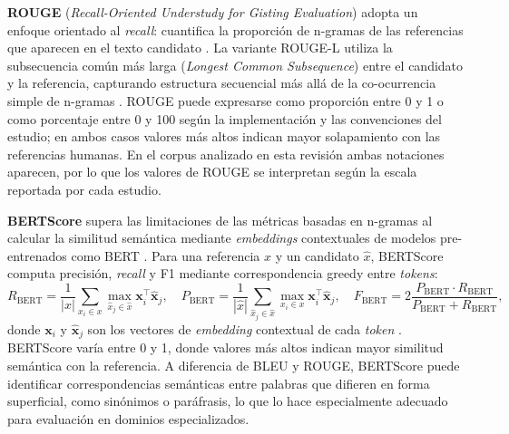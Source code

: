 \textbf{ROUGE} (\textit{Recall-Oriented Understudy for Gisting Evaluation}) adopta un enfoque orientado al \textit{recall}: cuantifica la proporción de n-gramas de las referencias que aparecen en el texto candidato \parencite[p.~1]{lin-2004-rouge}. La variante ROUGE-L utiliza la subsecuencia común más larga (\textit{Longest Common Subsequence}) entre el candidato y la referencia, capturando estructura secuencial más allá de la co-ocurrencia simple de n-gramas \parencite[p.~2]{lin-2004-rouge}. ROUGE puede expresarse como proporción entre 0 y 1 o como porcentaje entre 0 y 100 según la implementación y las convenciones del estudio; en ambos casos valores más altos indican mayor solapamiento con las referencias humanas. En el corpus analizado en esta revisión ambas notaciones aparecen, por lo que los valores de ROUGE se interpretan según la escala reportada por cada estudio.

\textbf{BERTScore} supera las limitaciones de las métricas basadas en n-gramas al calcular la similitud semántica mediante \textit{embeddings} contextuales de modelos pre-entrenados como BERT \parencite[p.~1]{zhang2020bertscore}. Para una referencia $x$ y un candidato $\hat{x}$, BERTScore computa precisión, \textit{recall} y F1 mediante correspondencia greedy entre \textit{tokens}:
\begin{equation}
R_{\text{BERT}} = \frac{1}{|x|} \sum_{x_i \in x} \max_{\hat{x}_j \in \hat{x}} \mathbf{x}_i^\top \hat{\mathbf{x}}_j, \quad
P_{\text{BERT}} = \frac{1}{|\hat{x}|} \sum_{\hat{x}_j \in \hat{x}} \max_{x_i \in x} \mathbf{x}_i^\top \hat{\mathbf{x}}_j, \quad
F_{\text{BERT}} = 2\frac{P_{\text{BERT}} \cdot R_{\text{BERT}}}{P_{\text{BERT}} + R_{\text{BERT}}},
\end{equation}
donde $\mathbf{x}_i$ y $\hat{\mathbf{x}}_j$ son los vectores de \textit{embedding} contextual de cada \textit{token} \parencite[p.~4]{zhang2020bertscore}. BERTScore varía entre 0 y 1, donde valores más altos indican mayor similitud semántica con la referencia. A diferencia de BLEU y ROUGE, BERTScore puede identificar correspondencias semánticas entre palabras que difieren en forma superficial, como sinónimos o paráfrasis, lo que lo hace especialmente adecuado para evaluación en dominios especializados.